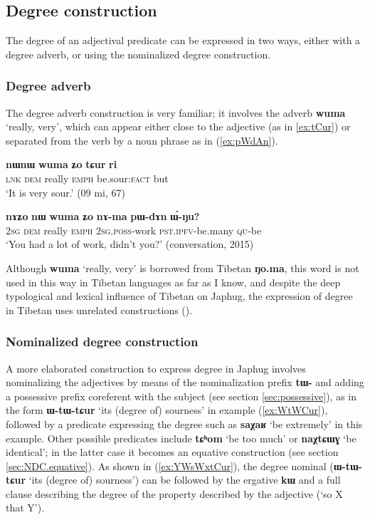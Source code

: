 \documentclass[oneside,a4paper,11pt]{article}
\newcommand{\ipa}[1]{{\phon\textbf{#1}}} %
\newcommand{\forme}[2]{\ipa{#1} `#2'}
\begin{document}
\subsection{Degree construction}
The degree of an adjectival predicate can be expressed in two ways, either with a degree adverb, or using the nominalized degree construction.

\subsubsection{Degree adverb} \label{sec:wuma}
The degree adverb construction is very familiar; it involves the adverb \forme{wuma}{really, very}, which can appear either close to the adjective (as in \ref{ex:tCur}) or separated from the verb by a noun phrase as in (\ref{ex:pWdAn}).

\begin{exe}
\ex \label{ex:tCur}
\gll \ipa{tɕe} 	\ipa{nɯnɯ} 	\ipa{wuma} 	\ipa{ʑo} 	\ipa{tɕur} 	\ipa{ri} \\
\textsc{lnk} \textsc{dem} really  \textsc{emph} be.sour:\textsc{fact} but \\
\glt `It is very sour.' (09 mi, 67)
\end{exe}

\begin{exe}
\ex \label{ex:pWdAn}
\gll
\ipa{nɤʑo} 	\ipa{nɯ} 	\ipa{wuma} 	\ipa{ʑo} 	\ipa{nɤ-ma} 	\ipa{pɯ-dɤn} 	\ipa{ɯ́-ŋu?}  \\
\textsc{2sg} \textsc{dem} really \textsc{emph} \textsc{2sg.poss}-work \textsc{pst.ipfv}-be.many \textsc{qu}-be \\
\glt `You had a lot of work, didn't you?' (conversation, 2015)
\end{exe}

Although \forme{wuma}{really, very} is borrowed from Tibetan \ipa{ŋo.ma}, this word is not used in this way in Tibetan languages as far as I know, and despite the deep typological and lexical influence of Tibetan on Japhug, the expression of degree in Tibetan uses unrelated constructions (\citealt{simon15evaluative}).

\subsubsection{Nominalized degree construction} \label{sec:NDC}
A more elaborated construction to express degree in Japhug involves nominalizing the adjectives by means of the nominalization prefix \ipa{tɯ-} and adding a possessive prefix coreferent with the subject (see section \ref{sec:possessive}), as in the form \forme{ɯ-tɯ-tɕur}{its (degree of) sourness} in example (\ref{ex:WtWCur}), followed by a predicate expressing the degree such as  \forme{saχaʁ}{be extremely} in this example. Other possible predicates include \forme{tɕʰom}{be too much} or \forme{naχtɕɯɣ}{be identical}; in the latter case it becomes an equative construction (see section \ref{sec:NDC.equative}).  As shown in (\ref{ex:YWsWxtCur}), the degree nominal (\ipa{ɯ-tɯ-tɕur} `its (degree of) sourness') can be followed by the ergative \ipa{kɯ} and a full clause describing the degree of the property described by the adjective (`so X that Y').
\end{document}
